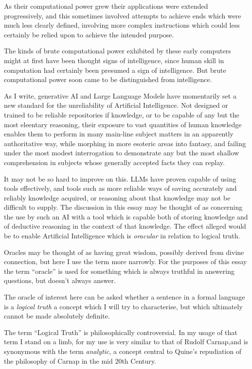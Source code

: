 \documentclass[10pt,titlepage]{article}
\begin{document}
As their computational power grew their applications were extended progressively, and this sometimes involved attempts to achieve ends which were much less clearly defined, involving more complex instructions which could less certainly be relied upon to achieve the intended purpose.

The kinds of brute computational power exhibited by these early computers might at first have been thought signs of intelligence, since human skill in computation had certainly been presumed a sign of intelligence.
But brute computational power soon came to be distinguished from intelligence.

As I write, generative AI and Large Language Models have momentarily set a new standard for the unreliability of Artificial Intelligence.
Not designed or trained to be reliable repositories if knowledge, or to be capable of any but the most eleentary reasoning, their exposure to vast quantities of human knowledge enables them to perform in many main-line subject matters in an apparently authoritative way, while morphing in more esoteric areas into fantasy, and failing under the most modest interrogation to demonstrate any but the most shallow comprehension in subjects whose generally accepted facts they can replay.

It may not be so hard to improve on this.
LLMs have proven capable of using tools effectively, and tools such as more reliable ways of saving accurately and reliably knowledge acquired, or reasoning about that knowledge may not be difficult to supply.
The discussion in this essay may be thought of as concerning the use by such an AI with a tool which is capable both of storing knowledge and of deductive reasoning in the context of that knowledge.
The effect alleged would be to enable Artificial Intelligence which is \emph{oracular} in relation to logical truth.

Oracles may be thought of as having great wisdom, possibly derived from divine connection, but here I use the term more narrowly.
For the purposes of this essay the term ``oracle'' is used for something which is always truthful in answering questions, but doesn't always answer.

The oracle of interest here can be asked whether a sentence in a formal language is a \emph{logical truth} a concept which I will try to characterise, but which ultimately cannot be made absolutely definite.

The term ``Logical Truth'' is philosophically controversial.
In my usage of that term I stand on a limb, for my use is very similar to that of Rudolf Carnap,and is synonymous with the term \emph{analytic}, a concept central to Quine's repudiation of the philosophy of Carnap in the mid 20th Century.
\end{document}
